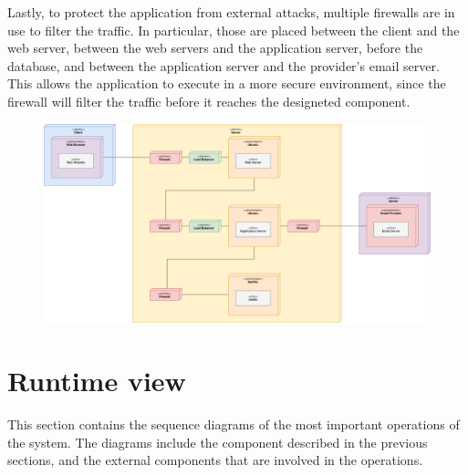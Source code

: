 Lastly, to protect the application from external attacks, multiple firewalls are in use to filter the traffic.
In particular, those are placed between the client and the web server, between the web servers and the application server, before the database, and between the application server and the provider's email server.
This allows the application to execute in a more secure environment, since the firewall will filter the traffic before it reaches the designeted component.

\begin{figure}[H]
    \centering
    \includegraphics[width=0.8\linewidth]{../../assets/deployment-diagrams/deployment-diagram.png}
\end{figure}

\section{Runtime view}

This section contains the sequence diagrams of the most important operations of the system.
The diagrams include the component described in the previous sections, and the external components that are involved in the operations.

